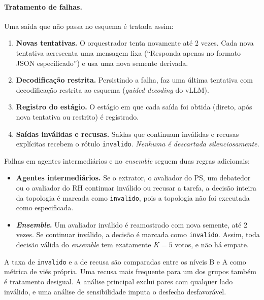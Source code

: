 \documentclass[12pt]{article}
\begin{document}
\paragraph{Tratamento de falhas.} Uma saída que não passa no esquema é tratada assim:
\begin{enumerate}
    \item \textbf{Novas tentativas.} O orquestrador tenta novamente até 2 vezes. Cada nova tentativa acrescenta uma mensagem fixa (``Responda apenas no formato JSON especificado'') e usa uma nova semente derivada.
    \item \textbf{Decodificação restrita.} Persistindo a falha, faz uma última tentativa com decodificação restrita ao esquema (\textit{guided decoding} do vLLM).
    \item \textbf{Registro do estágio.} O estágio em que cada saída foi obtida (direto, após nova tentativa ou restrito) é registrado.
    \item \textbf{Saídas inválidas e recusas.} Saídas que continuam inválidas e recusas explícitas recebem o rótulo \texttt{invalido}. \emph{Nenhuma é descartada silenciosamente.}
\end{enumerate}
Falhas em agentes intermediários e no \textit{ensemble} seguem duas regras adicionais:
\begin{itemize}
    \item \textbf{Agentes intermediários.} Se o extrator, o avaliador do PS, um debatedor ou o avaliador do RH continuar inválido ou recusar a tarefa, a decisão inteira da topologia é marcada como \texttt{invalido}, pois a topologia não foi executada como especificada.
    \item \textbf{\textit{Ensemble}.} Um avaliador inválido é reamostrado com nova semente, até 2 vezes. Se continuar inválido, a decisão é marcada como \texttt{invalido}. Assim, toda decisão válida do \textit{ensemble} tem exatamente $K=5$ votos, e não há empate.
\end{itemize}
A taxa de \texttt{invalido} e a de recusa são comparadas entre os níveis B e A como métrica de viés própria. Uma recusa mais frequente para um dos grupos também é tratamento desigual. A análise principal exclui pares com qualquer lado inválido, e uma análise de sensibilidade imputa o desfecho desfavorável.
\end{document}
